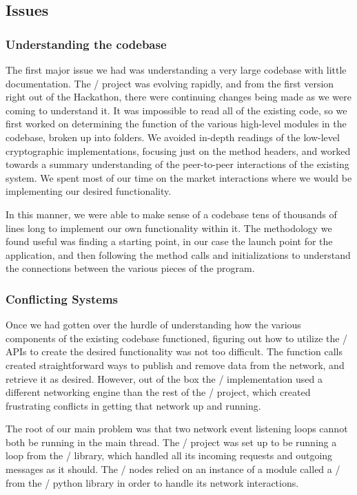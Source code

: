 \documentclass[12pt,twocolumn]{article}
\begin{document}
\subsection{Issues}

\subsubsection{Understanding the codebase}
The first major issue we had was understanding a very large codebase with little documentation.
The \OpenBazaar/ project was evolving rapidly, and from the first version right out of the Hackathon, there were continuing changes being made as we were coming to understand it.
It was impossible to read all of the existing code, so we first worked on determining the function of the various high-level modules in the codebase, broken up into folders.
We avoided in-depth readings of the low-level cryptographic implementations, focusing just on the method headers, and worked towards a summary understanding of the peer-to-peer interactions of the existing system.
We spent most of our time on the market interactions where we would be implementing our desired functionality.

In this manner, we were able to make sense of a codebase tens of thousands of lines long to implement our own functionality within it.
The methodology we found useful was finding a starting point, in our case the launch point for the application, and then following the method calls and initializations to understand the connections between the various pieces of the program.

\subsubsection{Conflicting Systems}
Once we had gotten over the hurdle of understanding how the various components of the existing codebase functioned, figuring out how to utilize the \Entangled/ APIs to create the desired functionality was not too difficult.
The function calls created straightforward ways to publish and remove data from the network, and retrieve it as desired.
However, out of the box the \Entangled/ implementation used a different networking engine than the rest of the \OpenBazaar/ project, which created frustrating conflicts in getting that network up and running.

The root of our main problem was that two network event listening loops cannot both be running in the main thread.
The \OpenBazaar/ project was set up to be running a loop from the \Tornado/ library, which handled all its incoming requests and outgoing messages as it should.
The \Entangled/ nodes relied on an instance of a module called a \reactor/ from the \Twisted/ python library in order to handle its network interactions.
\end{document}
